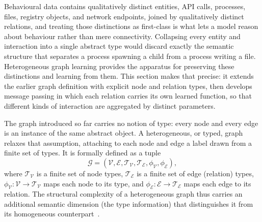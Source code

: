 \documentclass[%
    BCOR=10mm,
    DIV=13,
    toc=bibliography,
    toc=listof,
    oneside,
    12pt,
]{scrbook}
\begin{document}
Behavioural data contains qualitatively distinct entities, API calls, processes,
files, registry objects, and network endpoints, joined by qualitatively distinct
relations, and treating those distinctions as first-class is what lets a model
reason about behaviour rather than mere connectivity. Collapsing every entity and
interaction into a single abstract type would discard exactly the semantic
structure that separates a process spawning a child from a process writing a
file. Heterogeneous graph learning provides the apparatus for preserving these
distinctions and learning from them. This section makes that precise: it extends the earlier graph definition with
explicit node and relation types, then develops message passing in which each
relation carries its own learned function, so that different kinds of interaction
are aggregated by distinct parameters.

The graph introduced so far carries no notion of type: every node and every edge
is an instance of the same abstract object. A heterogeneous, or typed, graph
relaxes that assumption, attaching to each node and edge a label drawn from a
finite set of types. It is formally defined as a tuple
\begin{equation}
  \mathcal{G} = (\mathcal{V}, \mathcal{E}, \mathcal{T}_\mathcal{V}, \mathcal{T}_\mathcal{E},
  \phi_\mathcal{V}, \phi_\mathcal{E}),
  \label{eq:hetero_graph}
\end{equation}
where $\mathcal{T}_\mathcal{V}$ is a finite set of node types,
$\mathcal{T}_\mathcal{E}$ is a finite set of edge (relation) types,
$\phi_\mathcal{V}: \mathcal{V} \to \mathcal{T}_\mathcal{V}$ maps each node to
its type, and $\phi_\mathcal{E}: \mathcal{E} \to \mathcal{T}_\mathcal{E}$ maps
each edge to its relation. The structural complexity of a heterogeneous graph
thus carries an additional semantic dimension (the type information) that
distinguishes it from its homogeneous
counterpart~\cite{wang2019matchgnet, li2024imbalanced}.
\end{document}
